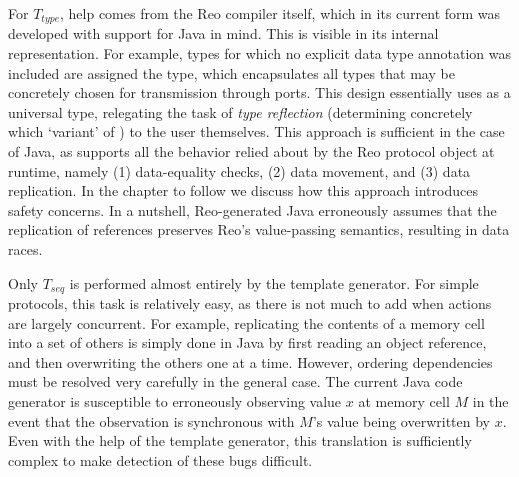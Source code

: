 For $T_{type}$, help comes from the Reo compiler itself, which in its current form was developed with support for Java in mind. This is visible in its internal representation. For example, types for which no explicit data type annotation was included are assigned the  type, which encapsulates all types that may be concretely chosen for transmission through ports. This design essentially uses  as a universal type, relegating the task of \textit{type reflection} (determining concretely which `variant' of ) to the user themselves. This approach is sufficient in the case of Java, as  supports all the behavior relied about by the Reo protocol object at runtime, namely (1) data-equality checks, (2) data movement, and (3) data replication. In the chapter to follow we discuss how this approach introduces safety concerns. In a nutshell, Reo-generated Java erroneously assumes that the replication of  references preserves Reo's value-passing semantics, resulting in data races.

Only $T_{seq}$ is performed almost entirely by the template generator. For simple protocols, this task is relatively easy, as there is not much to add when actions are largely concurrent. For example, replicating the contents of a memory cell into a set of others is simply done in Java by first reading an object reference, and then overwriting the others one at a time. However, ordering dependencies must be resolved very carefully in the general case. The current Java code generator is susceptible to erroneously observing value $x$ at memory cell $M$ in the event that the observation is synchronous with $M$'s value being overwritten by $x$. Even with the help of the template generator, this translation is sufficiently complex to make detection of these bugs difficult.

